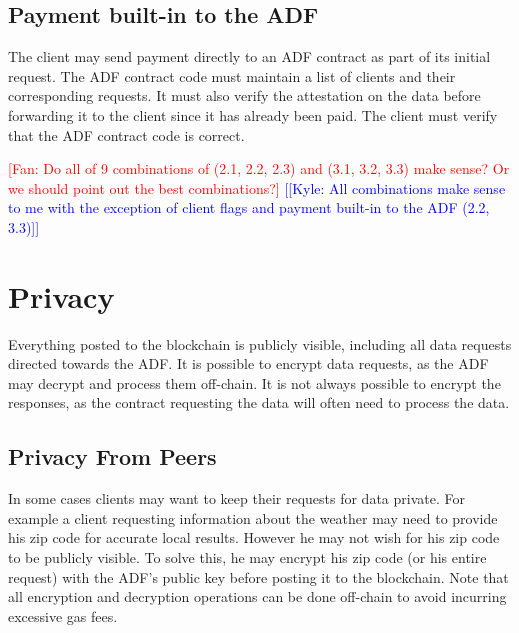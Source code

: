 \documentclass[letterpaper,twocolumn,10pt]{article}
\newcommand{\kyle}[1]{\textcolor{blue}{[[\textsf{Kyle:  #1}]]}}
\newcommand{\fan}[1]{\textcolor{red}{[\textsf{Fan:  #1}]}}
\begin{document}
\subsection{Payment built-in to the ADF}
    The client may send payment directly to an ADF contract as part of its initial request.  The ADF contract code must maintain a list of clients and their corresponding requests.  It must also verify the attestation on the data before forwarding it to the client since it has already been paid.  The client must verify that the ADF contract code is correct.
    
\fan{Do all of 9 combinations of (2.1, 2.2, 2.3) and (3.1, 3.2, 3.3) make sense? Or we should point out the best combinations?}
\kyle{All combinations make sense to me with the exception of client flags and payment built-in to the ADF (2.2, 3.3)}
    
\section{Privacy}
Everything posted to the blockchain is publicly visible, including all data requests directed towards the ADF.  It is possible to encrypt data requests, as the ADF may decrypt and process them off-chain.  It is not always possible to encrypt the responses, as the contract requesting the data will often need to process the data.

\subsection{Privacy From Peers}
    In some cases clients may want to keep their requests for data private.  For example a client requesting information about the weather may need to provide his zip code for accurate local results.  However he may not wish for his zip code to be publicly visible.  To solve this, he may encrypt his zip code (or his entire request) with the ADF's public key before posting it to the blockchain.  Note that all encryption and decryption operations can be done off-chain to avoid incurring excessive gas fees.\\
\end{document}
